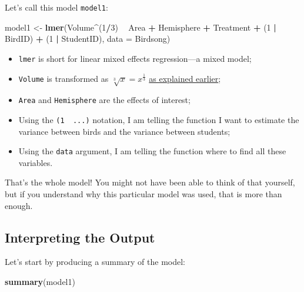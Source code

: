 \documentclass[
]{book}
\newenvironment{Shaded}{\begin{snugshade}}{\end{snugshade}}
\newcommand{\DataTypeTok}[1]{\textcolor[rgb]{0.13,0.29,0.53}{#1}}
\newcommand{\DecValTok}[1]{\textcolor[rgb]{0.00,0.00,0.81}{#1}}
\newcommand{\KeywordTok}[1]{\textcolor[rgb]{0.13,0.29,0.53}{\textbf{#1}}}
\newcommand{\NormalTok}[1]{#1}
\newcommand{\OperatorTok}[1]{\textcolor[rgb]{0.81,0.36,0.00}{\textbf{#1}}}
\newcommand{\StringTok}[1]{\textcolor[rgb]{0.31,0.60,0.02}{#1}}
\providecommand{\tightlist}{%
  \setlength{\itemsep}{0pt}\setlength{\parskip}{0pt}}
\begin{document}
Let's call this model \texttt{model1}:

\begin{Shaded}
\begin{Highlighting}[]
\NormalTok{model1 <-}\StringTok{ }\KeywordTok{lmer}\NormalTok{(Volume}\OperatorTok{^}\NormalTok{(}\DecValTok{1}\OperatorTok{/}\DecValTok{3}\NormalTok{) }\OperatorTok{~}\StringTok{ }\NormalTok{Area }\OperatorTok{+}\StringTok{ }\NormalTok{Hemisphere }\OperatorTok{+}\StringTok{ }\NormalTok{Treatment }\OperatorTok{+}\StringTok{ }\NormalTok{(}\DecValTok{1} \OperatorTok{|}\StringTok{ }\NormalTok{BirdID) }\OperatorTok{+}\StringTok{ }\NormalTok{(}\DecValTok{1} \OperatorTok{|}\StringTok{ }\NormalTok{StudentID), }\DataTypeTok{data =}\NormalTok{ Birdsong)}
\end{Highlighting}
\end{Shaded}

\begin{itemize}
\tightlist
\item
  \texttt{lmer} is short for linear mixed effects regression---a mixed model;
\item
  \texttt{Volume} is transformed as \(\sqrt[3]{x} = x^{\frac{1}{3}}\) \protect\hyperlink{braintransform}{as explained earlier};
\item
  \texttt{Area} and \texttt{Hemisphere} are the effects of interest;
\item
  Using the \texttt{(1\ \textbar{}\ ...)} notation, I am telling the function I want to estimate the variance between birds and the variance between students;
\item
  Using the \texttt{data} argument, I am telling the function where to find all these variables.
\end{itemize}

That's the whole model! You might not have been able to think of that yourself, but if you understand why this particular model was used, that is more than enough.

\hypertarget{interpretbrain}{%
\subsection{Interpreting the Output}\label{interpretbrain}}

Let's start by producing a summary of the model:

\begin{Shaded}
\begin{Highlighting}[]
\KeywordTok{summary}\NormalTok{(model1)}
\end{Highlighting}
\end{Shaded}
\end{document}
